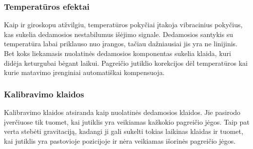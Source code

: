 \subsubsection{Temperatūros efektai}

Kaip ir giroskopu atžvilgiu, temperatūros pokyčiai įtakoja vibracinius pokyčius, kas sukelia dedamosios nestabilumus išėjimo signale. 
Dedamosios santykis su temperatūra labai priklauso nuo įrangos, tačiau dažniausiai jis yra ne linijinis. 
Bet koks liekamasis nuolatinės dedamosios komponentas sukelia klaida, kuri didėja keturgubai bėgant laikui. 
Pagreičio jutiklio korekcijos dėl temperatūros kai kurie matavimo įrenginiai automatiškai kompensuoja.

\subsubsection{Kalibravimo klaidos}

Kalibravimo klaidos atsiranda kaip nuolatinės dedamosios klaidos. 
Jie pasirodo įverčiuose tik tuomet, kai jutiklis yra veikiamas kažkokio pagreičio jėgos. 
Taip pat verta stebėti gravitaciją, kadangi ji gali sukelti tokias laikinas klaidas ir tuomet, kai jutiklis yra pastovioje pozicijoje ir nėra veikiamas išorinės pagreičio jėgos.

